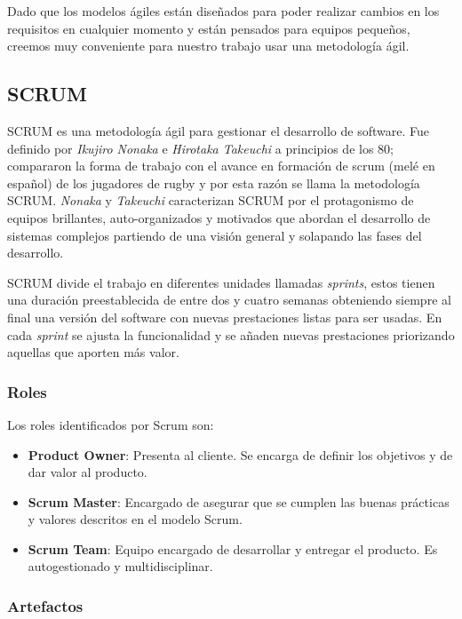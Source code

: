 	Dado que los modelos ágiles están diseñados para poder realizar cambios en los requisitos en cualquier momento y están pensados para equipos pequeños, creemos muy conveniente para nuestro trabajo usar una metodología ágil.
	
	\subsection{SCRUM}
	\label{cap2:subsec:SCRUM}
	
	SCRUM es una metodología ágil para gestionar el desarrollo de software. Fue definido por \textit{Ikujiro Nonaka} e \textit{Hirotaka Takeuchi} a principios de los 80; compararon la forma de trabajo con el avance en formación de scrum (melé en español) de los jugadores de rugby y por esta razón se llama la metodología SCRUM. \textit{Nonaka} y \textit{Takeuchi} caracterizan SCRUM por el protagonismo de equipos brillantes, auto-organizados y motivados que abordan el desarrollo de sistemas complejos partiendo de una visión general y solapando las fases del desarrollo.
	
	SCRUM divide el trabajo en diferentes unidades llamadas \textsl{sprints},  estos tienen una duración preestablecida de entre dos y cuatro semanas obteniendo siempre al final una versión del software con nuevas prestaciones listas para ser usadas. En cada \textsl{sprint} se ajusta la funcionalidad y se añaden nuevas prestaciones priorizando aquellas que aporten más valor. 
	
	\subsubsection{Roles}
	
	Los roles identificados por Scrum son:
	
	\begin{itemize}
		\item \textbf{Product Owner}: Presenta al cliente. Se encarga de definir los objetivos y de dar valor al producto.
		\item \textbf{Scrum Master}: Encargado de asegurar que se cumplen las buenas prácticas y valores descritos en el modelo Scrum.
		\item \textbf{Scrum Team}: Equipo encargado de desarrollar y entregar el producto. Es autogestionado y multidisciplinar.
	\end{itemize}
	
	\subsubsection{Artefactos}
	
